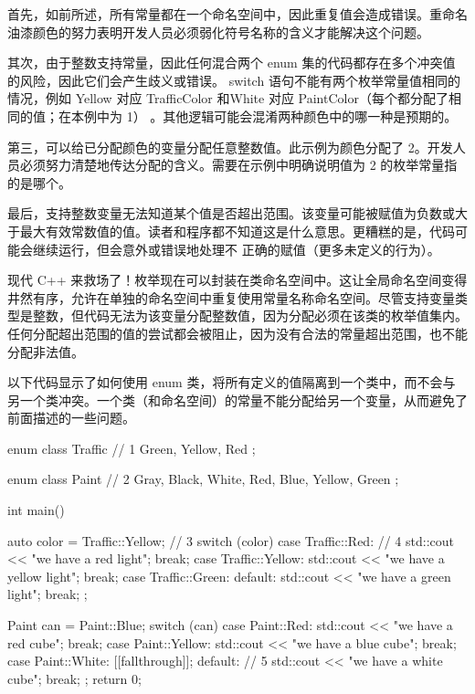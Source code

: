 首先，如前所述，所有常量都在一个命名空间中，因此重复值会造成错误。重命名油漆颜色的努力表明开发人员必须弱化符号名称的含义才能解决这个问题。

其次，由于整数支持常量，因此任何混合两个 enum 集的代码都存在多个冲突值的风险，因此它们会产生歧义或错误。 switch 语句不能有两个枚举常量值相同的情况，例如 Yellow 对应 TrafficColor 和White 对应 PaintColor（每个都分配了相同的值；在本例中为 1） 。其他逻辑可能会混淆两种颜色中的哪一种是预期的。

第三，可以给已分配颜色的变量分配任意整数值。此示例为颜色分配了 2。开发人员必须努力清楚地传达分配的含义。需要在示例中明确说明值为 2 的枚举常量指的是哪个。

最后，支持整数变量无法知道某个值是否超出范围。该变量可能被赋值为负数或大于最大有效常数值的值。读者和程序都不知道这是什么意思。更糟糕的是，代码可能会继续运行，但会意外或错误地处理不 正确的赋值（更多未定义的行为）。


现代 C++ 来救场了！枚举现在可以封装在类命名空间中。这让全局命名空间变得井然有序，允许在单独的命名空间中重复使用常量名称命名空间。尽管支持变量类型是整数，但代码无法为该变量分配整数值，因为分配必须在该类的枚举值集内。任何分配超出范围的值的尝试都会被阻止，因为没有合法的常量超出范围，也不能分配非法值。

以下代码显示了如何使用 enum 类，将所有定义的值隔离到一个类中，而不会与另一个类冲突。一个类（和命名空间）的常量不能分配给另一个变量，从而避免了前面描述的一些问题。


\begin{cpp}
enum class Traffic { // 1
  Green,
  Yellow,
  Red
};

enum class Paint { // 2
  Gray,
  Black,
  White,
  Red,
  Blue,
  Yellow,
  Green
};

int main() {
  auto color = Traffic::Yellow; // 3
  switch (color) {
  case Traffic::Red: // 4
    std::cout << "we have a red light\n";
    break;
  case Traffic::Yellow:
    std::cout << "we have a yellow light\n";
    break;
  case Traffic::Green:
  default:
    std::cout << "we have a green light\n";
    break;
  };

  Paint can = Paint::Blue;
  switch (can) {
  case Paint::Red:
    std::cout << "we have a red cube\n";
    break;
  case Paint::Yellow:
    std::cout << "we have a blue cube\n";
    break;
  case Paint::White:
    [[fallthrough]];
  default: // 5
    std::cout << "we have a white cube\n";
    break;
  };
  return 0;
}
\end{cpp}


